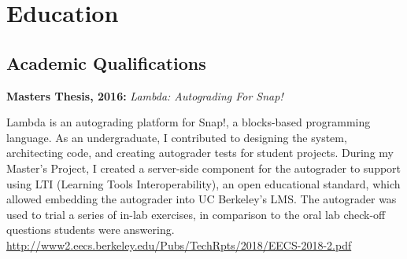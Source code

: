 \section{Education}

\vspace{5pt}

\subsection{Academic Qualifications}

\vspace{5pt}


\vspace{5pt} %

    

\vspace{10pt}




\textbf{Masters Thesis, 2016:} \textit{Lambda: Autograding For Snap!}

\vspace{3pt}

\small{Lambda is an autograding platform for Snap!, a blocks-based programming language. As an undergraduate, I contributed to designing the system, architecting code, and creating autograder tests for student projects. During my Master's Project, I created a server-side component for the autograder to support using LTI (Learning Tools Interoperability), an open educational standard, which allowed embedding the autograder into UC Berkeley's LMS. The autograder was used to trial a series of in-lab exercises, in comparison to the oral lab check-off questions students were answering.}
\linebreak
\small{\href{http://www2.eecs.berkeley.edu/Pubs/TechRpts/2018/EECS-2018-2.pdf}{http://www2.eecs.berkeley.edu/Pubs/TechRpts/2018/EECS-2018-2.pdf}}

\vspace{15pt}

